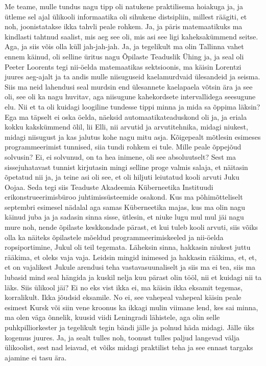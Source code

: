 Me teame, mulle tundus nagu tipp oli natukene praktilisema hoiakuga ja, ja ütleme sel ajal ülikooli informaatika oli sihukene distsipliin, millest räägiti, et noh, joonistatakse ikka tahvli peale rohkem. Ja, ja päris matemaatikuks ma kindlasti tahtnud saalist, mis aeg see oli, mis asi see ligi kaheksakümmend seitse. Aga, ja siis võis olla küll jah-jah-jah. Ja, ja tegelikult ma olin Tallinna vahet ennem käinud, oli selline üritus nagu Õpilaste Teaduslik Ühing ja, ja seal oli Peeter Loorents tegi nii-öelda matemaatikas sektsioonis, ma käisin Lorentzi juures aeg-ajalt ja ta andis mulle niisuguseid kaelamurdvaid ülesandeid ja seisma. Siis ma neid lahendusi seal murdsin end ülesannete kaelapaela võtsin ära ja see oli, see oli ka nagu huvitav, aga niisugune kahekordsete intervallidega seesugune elu. Nii et ta oli kuidagi loogiline tundesse tippi minna ja mida sa õppima läksin? Ega ma täpselt ei oska öelda, näeksid automaatikateaduskond oli ja, ja eriala kokku kakskümmend õlil, lii Elli, nii arvutid ja arvutitehnika, midagi niukest, midagi niisugust ja kas jalutus kohe nagu mitu asja. Kõigepealt mõtlesin esimeses programmeerimist tunnised, siia tundi rohkem ei tule. Mille peale õppejõud solvusin? Ei, ei solvunud, on ta hea inimene, oli see absoluutselt? Sest ma sissejuhatavast tunnist kirjutasin mingi selline proge valmis salaja, et näitasin õpetatud nii ja, ja teine asi oli see, et oli hiljuti leiutatud kooli arvuti Juku Oojaa. Seda tegi siis Teaduste Akadeemia Küberneetika Instituudi erikonstrueerimisbüroo juhtimissüsteemide osakond.
Kus ma põhimõtteliselt septembri esimesel nädalal aga samas Küberneetika majas, kus ma olin nagu käinud juba ja ja sadasin sinna sisse, ütlesin, et niuke lugu mul mul jäi nagu mure noh, nende õpilaste keskkondade pärast, et kui tuleb kooli arvuti, siis võiks olla ka näiteks õpilastele mõeldud programmeerimiskeeled ja nii-öelda ropsiportimine, Jukul oli teil tegemata. Läheksin sinna, hakkasin niukest juttu rääkima, et oleks vaja vaja. Leidsin mingid inimesed ja hakkasin rääkima, et, et, et on vajalikest Jukule arendusi teha vastavasuunaliselt ja siis ma ei tea, siis ma lubasid mind seal hängida ja kuskil nelja kuu pärast olin tööl, nii et kuidagi nii ta läks. Siis ülikool jäi? Ei no eks vist ikka ei, ma käisin ikka eksamit tegemas, korralikult. Ikka jõudsid eksamile. No ei, see vahepeal vahepeal käisin peale esimest Kursk või siin vene kroonus ka ikkagi mulin viimane lend, kes sai minna, ma olen väga õnnelik, kuusid viidi Leningradi lähistele, aga olin selle puhkpilliorkester ja tegelikult tegin bändi jälle ja polnud häda midagi. Jälle üks kogemus juures. Ja, ja sealt tulles noh, toonust tulles paljud langevad välja ülikoolist, sest nad leiavad, et võiks midagi praktilist teha ja see ennast targaks ajamine ei tasu ära.
